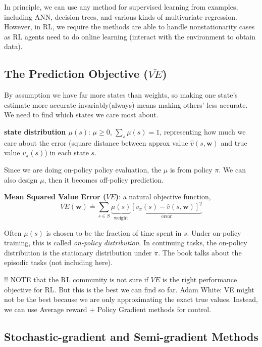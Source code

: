 \documentclass[sutton_barto_notes.tex]{subfiles}
\begin{document}
In principle, we can use any method for supervised learning from examples, including ANN, decision trees, and various kinds of multivariate regression.
However, in RL, we require the methods are able to handle nonstationarity cases as RL agents need to do online learning (interact with the environment to obtain data).

\subsection{The Prediction Objective ($\overline{VE}$)}

By assumption we have far more states than weights, so making one state's estimate more accurate invariably(always) means making others' less accurate. We need to find which states we care most about.

\begin{definition}
\textbf{state distribution $\mu(s)$}: $\mu \geq 0$, $\sum_s \mu(s) = 1$, representing how much we care about the error (square distance between approx value $\hat{v}(s,\bm{w})$ and true value $v_\pi(s)$) in each state $s$.
\end{definition}

Since we are doing on-policy policy evaluation, the $\mu$ is from policy $\pi$. We can also design $\mu$, then it becomes off-policy prediction.

\begin{definition}
\textbf{Mean Squared Value Error ($\overline{VE}$)}: a natural objective function,
$$\overline{VE}(\bm{w}) \doteq \sum_{s\in S} \underbrace{\mu(s)}_{\text{weight}} \underbrace{[v_\pi(s) - \hat{v}(s,\bm{w})]^2}_{\text{error}}$$
\end{definition}

Often $\mu(s)$ is chosen to be the fraction of time spent in $s$. Under on-policy training, this is called \textit{on-policy distribution}. In continuing tasks, the on-policy distribution is the stationary distribution under $\pi$. The book talks about the episodic tasks (not including here).

!! NOTE that the RL community is not sure if $\overline{VE}$ is the right performance objective for RL. But this is the best we can find so far. Adam White: VE might not be the best because we are only approximating the exact true values. Instead, we can use Average reward + Policy Gradient methods for control.

\subsection{Stochastic-gradient and Semi-gradient Methods}
\end{document}
